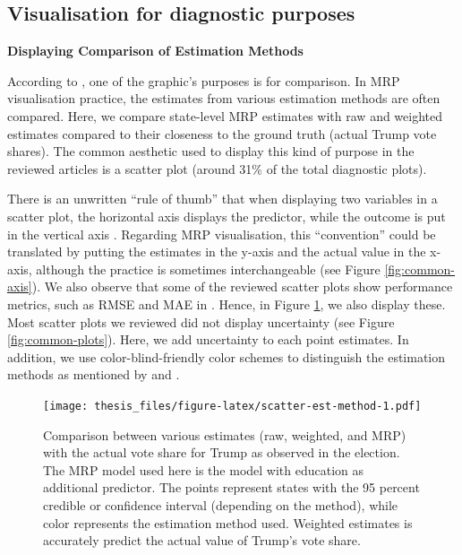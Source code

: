\documentclass{monashthesis}
\begin{document}
\hypertarget{vis-purp}{%
\subsection{Visualisation for diagnostic purposes}\label{vis-purp}}

\textbf{Displaying Comparison of Estimation Methods}

According to \textcite{tukey}, one of the graphic's purposes is for comparison. In MRP visualisation practice, the estimates from various estimation methods are often compared. Here, we compare state-level MRP estimates with raw and weighted estimates compared to their closeness to the ground truth (actual Trump vote shares). The common aesthetic used to display this kind of purpose in the reviewed articles is a scatter plot (around 31\% of the total diagnostic plots).

There is an unwritten ``rule of thumb'' that when displaying two variables in a scatter plot, the horizontal axis displays the predictor, while the outcome is put in the vertical axis \autocite{gelmanunwin}. Regarding MRP visualisation, this ``convention'' could be translated by putting the estimates in the y-axis and the actual value in the x-axis, although the practice is sometimes interchangeable (see Figure \ref{fig:common-axis}). We also observe that some of the reviewed scatter plots show performance metrics, such as RMSE and MAE in \textcite{MengXiao-Li2018Spap}. Hence, in Figure \ref{fig:scatter-est-method}, we also display these. Most scatter plots we reviewed did not display uncertainty (see Figure \ref{fig:common-plots}). Here, we add uncertainty to each point estimates. In addition, we use color-blind-friendly color schemes to distinguish the estimation methods as mentioned by \textcite{vanderplas} and \textcite{statgraph}.

\begin{figure}
\centering
\texttt{[image: thesis\_files/figure-latex/scatter-est-method-1.pdf]}
\caption{\label{fig:scatter-est-method}Comparison between various estimates (raw, weighted, and MRP) with the actual vote share for Trump as observed in the election. The MRP model used here is the model with education as additional predictor. The points represent states with the 95 percent credible or confidence interval (depending on the method), while color represents the estimation method used. Weighted estimates is accurately predict the actual value of Trump's vote share.}
\end{figure}
\end{document}
